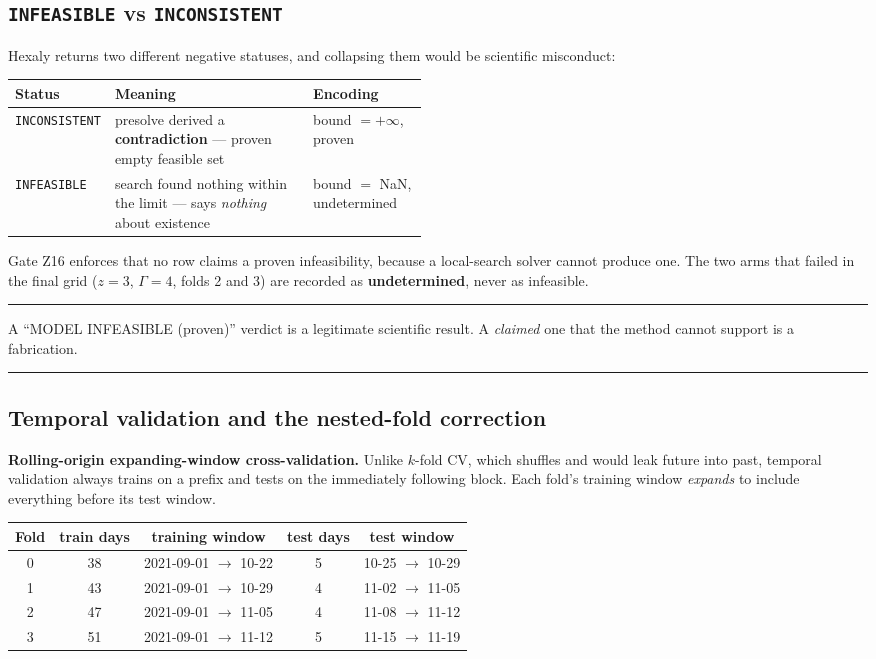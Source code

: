 \documentclass[11pt,a4paper]{article}
\newenvironment{keybox}
  {\par\medskip\noindent\rule{\linewidth}{0.9pt}\par\nobreak\smallskip\ignorespaces}
  {\par\smallskip\nobreak\noindent\rule{\linewidth}{0.9pt}\par\medskip}
\begin{document}
\subsection{\texorpdfstring{\texttt{INFEASIBLE} vs \texttt{INCONSISTENT}}{INFEASIBLE vs INCONSISTENT}}

Hexaly returns two different negative statuses, and collapsing them would be
scientific misconduct:

\begin{center}
\begin{tabular}{lp{0.48\linewidth}l}
\toprule
Status & Meaning & Encoding \\
\midrule
\texttt{INCONSISTENT} & presolve derived a \textbf{contradiction} --- proven empty feasible set & bound $=+\infty$, proven \\
\texttt{INFEASIBLE}   & search found nothing within the limit --- says \emph{nothing} about existence & bound $=$ NaN, undetermined \\
\bottomrule
\end{tabular}
\end{center}

Gate Z16 enforces that no row claims a proven infeasibility, because a
local-search solver cannot produce one. The two arms that failed in the final
grid ($z=3$, $\Gamma=4$, folds 2 and 3) are recorded as \textbf{undetermined},
never as infeasible.

\begin{keybox}
A ``MODEL INFEASIBLE (proven)'' verdict is a legitimate scientific result. A
\emph{claimed} one that the method cannot support is a fabrication.
\end{keybox}

\subsection{Temporal validation and the nested-fold correction}
\label{sec:folds}

\textbf{Rolling-origin expanding-window cross-validation.} Unlike $k$-fold CV,
which shuffles and would leak future into past, temporal validation always
trains on a prefix and tests on the immediately following block. Each fold's
training window \emph{expands} to include everything before its test window.

\begin{center}
\begin{tabular}{ccccc}
\toprule
Fold & train days & training window & test days & test window \\
\midrule
0 & 38 & 2021-09-01 $\to$ 10-22 & 5 & 10-25 $\to$ 10-29 \\
1 & 43 & 2021-09-01 $\to$ 10-29 & 4 & 11-02 $\to$ 11-05 \\
2 & 47 & 2021-09-01 $\to$ 11-05 & 4 & 11-08 $\to$ 11-12 \\
3 & 51 & 2021-09-01 $\to$ 11-12 & 5 & 11-15 $\to$ 11-19 \\
\bottomrule
\end{tabular}
\end{center}
\end{document}
